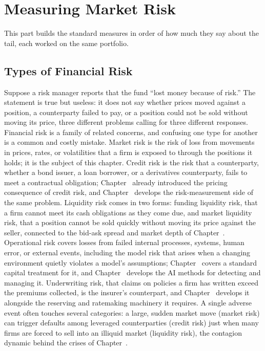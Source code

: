 \documentclass[../ai_in_finance]{subfiles}
\begin{document}
\section{Measuring Market Risk}

This part builds the standard measures in order of how much they say about the tail, each worked on the same portfolio.

\subsection{Types of Financial Risk}
\label{sec:risk-types}

Suppose a risk manager reports that the fund ``lost money because of risk.'' The statement is true but useless: it does not say whether prices moved against a position, a counterparty failed to pay, or a position could not be sold without moving its price, three different problems calling for three different responses. Financial risk is a family of related concerns, and confusing one type for another is a common and costly mistake.
Market risk is the risk of loss from movements in prices, rates, or volatilities that a firm is exposed to through the positions it holds; it is the subject of this chapter.
Credit risk is the risk that a counterparty, whether a bond issuer, a loan borrower, or a derivatives counterparty, fails to meet a contractual obligation; Chapter~ already introduced the pricing consequence of credit risk, and Chapter~ develops the risk-measurement side of the same problem.
Liquidity risk comes in two forms: funding liquidity risk, that a firm cannot meet its cash obligations as they come due, and market liquidity risk, that a position cannot be sold quickly without moving its price against the seller, connected to the bid-ask spread and market depth of Chapter~.
Operational risk covers losses from failed internal processes, systems, human error, or external events, including the model risk that arises when a changing environment quietly violates a model's assumptions; Chapter~ covers a standard capital treatment for it, and Chapter~ develops the AI methods for detecting and managing it.
Underwriting risk, that claims on policies a firm has written exceed the premiums collected, is the insurer's counterpart, and Chapter~ develops it alongside the reserving and ratemaking machinery it requires.
A single adverse event often touches several categories: a large, sudden market move (market risk) can trigger defaults among leveraged counterparties (credit risk) just when many firms are forced to sell into an illiquid market (liquidity risk), the contagion dynamic behind the crises of Chapter~.
\end{document}
